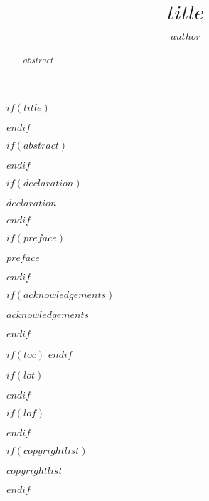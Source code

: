 \documentclass[11pt,a4paper,titlepage,twoside,openright]{style/unimelbthesis}
\title{$title$}
\author{$author$}
\begin{document}

\begin{frontmatter}

\frontmatterheadings


$if(title)$
  \maketitle
$endif$


$if(abstract)$
  \begin{abstract}
    $abstract$
  \end{abstract}
$endif$


$if(declaration)$
  \begin{declaration}
    $declaration$
  \end{declaration}
$endif$


$if(preface)$
  \begin{preface}
    $preface$
  \end{preface}
$endif$


$if(acknowledgements)$
  \begin{acknowledgements}
    $acknowledgements$
  \end{acknowledgements}
$endif$


$if(toc)$
  \hypersetup{linkcolor=$if(toccolor)$$toccolor$$else$black$endif$}
  \setcounter{tocdepth}{$toc-depth$}
  \tableofcontents
$endif$


$if(lot)$
  \listoftables
$endif$


$if(lof)$
  \listoffigures
$endif$


$if(copyrightlist)$
  \begin{copyrightlist}
    $copyrightlist$
  \end{copyrightlist}
$endif$

\end{frontmatter}
\end{document}
